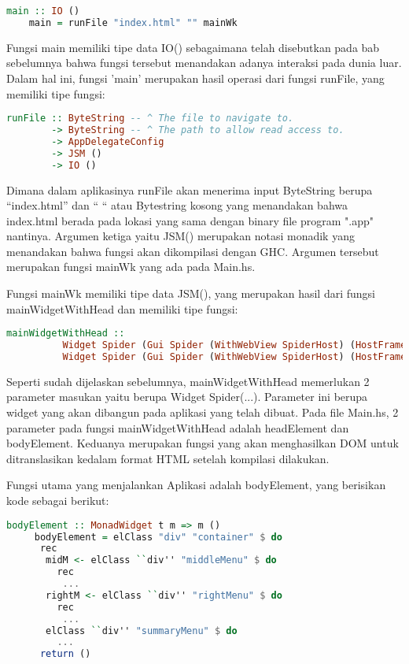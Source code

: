 \documentclass[pi.tex]{subfile}
\begin{document}
  \begin{lstlisting}[language=Haskell]
    main :: IO ()
    main = runFile "index.html" "" mainWk
  \end{lstlisting}

  Fungsi main memiliki tipe data IO() sebagaimana telah disebutkan pada bab sebelumnya bahwa fungsi tersebut menandakan adanya interaksi pada dunia luar. Dalam hal ini, fungsi 'main' merupakan hasil operasi dari fungsi runFile, yang memiliki tipe fungsi:
    \begin{lstlisting}[language=Haskell]
  runFile :: ByteString -- ^ The file to navigate to.
        -> ByteString -- ^ The path to allow read access to.
        -> AppDelegateConfig
        -> JSM ()
        -> IO ()
    \end{lstlisting}
    Dimana dalam aplikasinya runFile akan menerima input ByteString berupa ``index.html'' dan `` `` atau Bytestring kosong yang menandakan bahwa index.html berada pada lokasi yang sama dengan binary file program ".app" nantinya. Argumen ketiga yaitu JSM() merupakan notasi monadik yang menandakan bahwa fungsi akan dikompilasi dengan GHC. Argumen tersebut merupakan fungsi mainWk yang ada pada Main.hs.

    Fungsi mainWk memiliki tipe data JSM(), yang merupakan hasil dari fungsi mainWidgetWithHead dan memiliki tipe fungsi:
   \begin{lstlisting}[language=Haskell]
      mainWidgetWithHead ::
          Widget Spider (Gui Spider (WithWebView SpiderHost) (HostFrame Spider)) () ->
          Widget Spider (Gui Spider (WithWebView SpiderHost) (HostFrame Spider)) () -> IO ()
   \end{lstlisting}
   Seperti sudah dijelaskan sebelumnya, mainWidgetWithHead memerlukan 2 parameter masukan yaitu berupa Widget Spider(...). Parameter ini berupa widget yang akan dibangun pada aplikasi yang telah dibuat. Pada file Main.hs, 2 parameter pada fungsi mainWidgetWithHead adalah headElement dan bodyElement. Keduanya merupakan fungsi yang akan menghasilkan DOM untuk ditranslasikan kedalam format HTML setelah kompilasi dilakukan.

   Fungsi utama yang menjalankan Aplikasi adalah bodyElement, yang berisikan kode sebagai berikut:
   
   \begin{lstlisting}[language=Haskell]
     bodyElement :: MonadWidget t m => m ()
     bodyElement = elClass "div" "container" $ do
      rec
       midM <- elClass ``div'' "middleMenu" $ do
         rec
          ...
       rightM <- elClass ``div'' "rightMenu" $ do
         rec
          ...
       elClass ``div'' "summaryMenu" $ do
         ...
      return ()
   \end{lstlisting}
\end{document}
